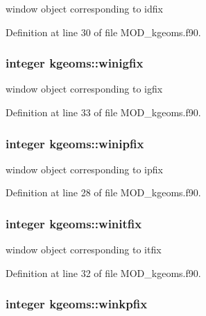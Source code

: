 window object corresponding to idfix 



Definition at line 30 of file M\-O\-D\-\_\-kgeoms.\-f90.

\hypertarget{classkgeoms_a8b3e8e6e93f4f27f90080072acd6f51c}{
\subsubsection[{winigfix}]{\setlength{\rightskip}{0pt plus 5cm}integer kgeoms\-::winigfix}}\label{classkgeoms_a8b3e8e6e93f4f27f90080072acd6f51c}


window object corresponding to igfix 



Definition at line 33 of file M\-O\-D\-\_\-kgeoms.\-f90.

\hypertarget{classkgeoms_ac7889d0d333527feba2dfdaaee41c789}{
\subsubsection[{winipfix}]{\setlength{\rightskip}{0pt plus 5cm}integer kgeoms\-::winipfix}}\label{classkgeoms_ac7889d0d333527feba2dfdaaee41c789}


window object corresponding to ipfix 



Definition at line 28 of file M\-O\-D\-\_\-kgeoms.\-f90.

\hypertarget{classkgeoms_a4ef80408ce8a0e25f47e95bf3fb7ff15}{
\subsubsection[{winitfix}]{\setlength{\rightskip}{0pt plus 5cm}integer kgeoms\-::winitfix}}\label{classkgeoms_a4ef80408ce8a0e25f47e95bf3fb7ff15}


window object corresponding to itfix 



Definition at line 32 of file M\-O\-D\-\_\-kgeoms.\-f90.

\hypertarget{classkgeoms_adba1e0f07cf17d58c8d677eaa8a1c2f8}{
\subsubsection[{winkpfix}]{\setlength{\rightskip}{0pt plus 5cm}integer kgeoms\-::winkpfix}}\label{classkgeoms_adba1e0f07cf17d58c8d677eaa8a1c2f8}


